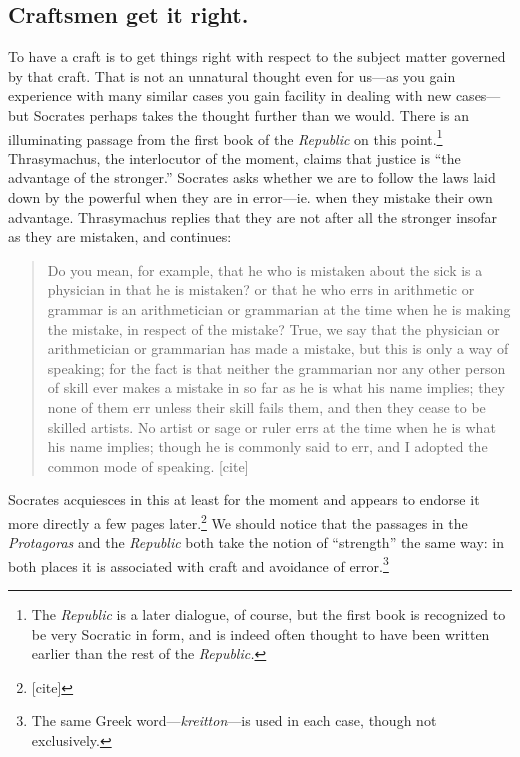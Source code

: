 \documentclass[11pt]{amsart}
\begin{document}
\subsection{Craftsmen get it right.} To have a craft is to get things right with respect to the subject matter governed by that craft. That is not an unnatural thought even for us---as you gain experience with many similar cases you gain facility in dealing with new cases---but Socrates perhaps takes the thought further than we would. There is an illuminating passage from the first book of the \emph{Republic} on this point.\footnote{The \emph{Republic} is a later dialogue, of course, but the first book is recognized to be very Socratic in form, and is indeed often thought to have been written earlier than the rest of the \emph{Republic.}} Thrasymachus, the interlocutor of the moment, claims that justice is ``the advantage of the stronger.'' Socrates asks whether we are to follow the laws laid down by the powerful when they are in error---ie. when they mistake their own advantage. Thrasymachus replies that they are not after all the stronger insofar as they are mistaken, and continues:\begin{quote}Do you mean, for example, that he who is mistaken about the sick is a physician in that he is mistaken? or that he who errs in arithmetic or grammar is an arithmetician or grammarian at the time when he is making the mistake, in respect of the mistake? True, we say that the physician or arithmetician or grammarian has made a mistake, but this is only a way of speaking; for the fact is that neither the grammarian nor any other person of skill ever makes a mistake in so far as he is what his name implies; they none of them err unless their skill fails them, and then they cease to be skilled artists. No artist or sage or ruler errs at the time when he is what his name implies; though he is commonly said to err, and I adopted the common mode of speaking. [cite]\end{quote} Socrates acquiesces in this at least for the moment and appears to endorse it more directly a few pages later.\footnote{[cite]} We should notice that the passages in the \emph{Protagoras} and the \emph{Republic} both take the notion of ``strength'' the same way: in both places it is associated with craft and avoidance of error.\footnote{The same Greek word---\emph{kreitton}---is used in each case, though not exclusively.}\\
\end{document}
